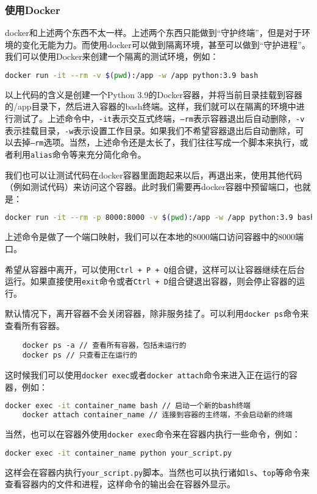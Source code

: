 \documentclass[../main.tex]{subfiles}
\begin{document}
\subsubsection{使用Docker}

docker和上述两个东西不太一样。上述两个东西只能做到“守护终端”，但是对于环境的变化无能为力。而使用docker可以做到隔离环境，甚至可以做到“守护进程”。我们可以使用Docker来创建一个隔离的测试环境，例如：
\begin{lstlisting}[language=bash]
    docker run -it --rm -v $(pwd):/app -w /app python:3.9 bash
\end{lstlisting}
以上代码的含义是创建一个Python 3.9的Docker容器，并将当前目录挂载到容器的/app目录下，然后进入容器的bash终端。这样，我们就可以在隔离的环境中进行测试了。上述命令中，\texttt{-it}表示交互式终端，\texttt{--rm}表示容器退出后自动删除，\texttt{-v}表示挂载目录，\texttt{-w}表示设置工作目录。如果我们不希望容器退出后自动删除，可以去掉\texttt{--rm}选项。当然，上述命令还是太长了，我们往往写成一个脚本来执行，或者利用\texttt{alias}命令等来充分简化命令。

我们也可以让测试代码在docker容器里面跑起来以后，再退出来，使用其他代码（例如测试代码）来访问这个容器。此时我们需要再docker容器中预留端口，也就是：
\begin{lstlisting}[language=bash]
    docker run -it --rm -p 8000:8000 -v $(pwd):/app -w /app python:3.9 bash
\end{lstlisting}
上述命令是做了一个端口映射，我们可以在本地的8000端口访问容器中的8000端口。

希望从容器中离开，可以使用\texttt{Ctrl + P + Q}组合键，这样可以让容器继续在后台运行。如果直接使用\texttt{exit}命令或者\texttt{Ctrl + D}组合键退出容器，则会停止容器的运行。

默认情况下，离开容器不会关闭容器，除非服务挂了。可以利用\texttt{docker ps}命令来查看所有容器。
\begin{lstlisting}
    docker ps -a // 查看所有容器，包括未运行的
    docker ps // 只查看正在运行的
\end{lstlisting}

这时候我们可以使用\texttt{docker exec}或者\texttt{docker attach}命令来进入正在运行的容器，例如：
\begin{lstlisting}[language=bash]
    docker exec -it container_name bash // 启动一个新的bash终端
    docker attach container_name // 连接到容器的主终端，不会启动新的终端
\end{lstlisting}

当然，也可以在容器外使用\texttt{docker exec}命令来在容器内执行一些命令，例如：
\begin{lstlisting}[language=bash]
    docker exec -it container_name python your_script.py
\end{lstlisting}
这样会在容器内执行\texttt{your\_script.py}脚本。当然也可以执行诸如\texttt{ls}、\texttt{top}等命令来查看容器内的文件和进程，这样命令的输出会在容器外显示。
\end{document}
